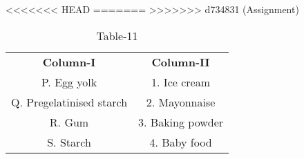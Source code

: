 \begin{table}[htbp]
  \centering
  \caption{Table-11}
<<<<<<< HEAD
  \label{tab:tables/table11.tex}
=======
  \label{table11}
>>>>>>> d734831 (Assignment)
  \begin{tabular}{cc}
\textbf{Column-I} & \textbf{Column-II}\\

P. Egg yolk & 1. Ice cream \\
Q. Pregelatinised starch & 2. Mayonnaise \\
R. Gum & 3. Baking powder \\
S. Starch & 4. Baby food \\
  
  
  
  \end{tabular}
\end{table}